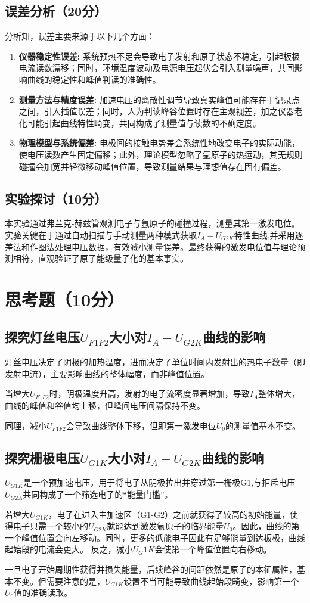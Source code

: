 \documentclass[]{../../templates/Report}%
\begin{document}
\begin{fullreportonly}
\subsection{误差分析（20分）}
分析知，误差主要来源于以下几个方面：
\begin{enumerate}
\item \textbf{仪器稳定性误差:} 系统预热不足会导致电子发射和原子状态不稳定，引起板极电流读数漂移；同时，环境温度波动及电源电压起伏会引入测量噪声，共同影响曲线的稳定性和峰值判读的准确性。
\item \textbf{测量方法与精度误差:} 加速电压的离散性调节导致真实峰值可能存在于记录点之间，引入插值误差；同时，人为判读峰谷位置时存在主观视差，加之仪器老化可能引起曲线特性畸变，共同构成了测量值与读数的不确定度。
\item \textbf{物理模型与系统偏差:} 电极间的接触电势差会系统性地改变电子的实际动能，使电压读数产生固定偏移；此外，理论模型忽略了氩原子的热运动，其无规则碰撞会加宽并轻微移动峰值位置，导致测量结果与理想值存在固有偏差。
\end{enumerate}
\subsection{实验探讨（10分）}
本实验通过弗兰克-赫兹管观测电子与氩原子的碰撞过程，测量其第一激发电位。实验关键在于通过自动扫描与手动测量两种模式获取$I_A-U_{G2K}$特性曲线,并采用逐差法和作图法处理电压数据，有效减小测量误差。最终获得的激发电位值与理论预测相符，直观验证了原子能级量子化的基本事实。
\section{思考题（10分）}
\subsection{探究灯丝电压$U_{F1F2}$大小对$I_A-U_{G2K}$曲线的影响}
灯丝电压决定了阴极的加热温度，进而决定了单位时间内发射出的热电子数量（即发射电流），主要影响曲线的整体幅度，而非峰值位置。
\par
当增大$U_{F1F2}$时，阴极温度升高，发射的电子流密度显著增加，导致$I_A$整体增大，曲线的峰值和谷值均上移，但峰间电压间隔保持不变。
\par
同理，减小$U_{F1F2}$会导致曲线整体下移，但即第一激发电位$U_0$的测量值基本不变。

\subsection{探究栅极电压$U_{G1K}$大小对$I_A-U_{G2K}$曲线的影响}
$U_{G1K}$是一个预加速电压，用于将电子从阴极拉出并穿过第一栅极G1,与拒斥电压$U_{G2A}$共同构成了一个筛选电子的“能量门槛”。
\par
若增大$U_{G1K}$，电子在进入主加速区（G1-G2）之前就获得了较高的初始能量，使得电子只需一个较小的$U_{G2K}$就能达到激发氩原子的临界能量$U_0$。因此，曲线的第一个峰值位置会向左移动。同时，更多的低能电子因此有足够能量到达板极，曲线起始段的电流会更大。
反之，减小$U_G1K$会使第一个峰值位置向右移动。
\par
一旦电子开始周期性获得并损失能量，后续峰谷的间距依然是原子的本征属性，基本不变。但需要注意的是，$U_{G1K}$设置不当可能导致曲线起始段畸变，影响第一个$U_0$值的准确读取。

\end{fullreportonly}
\end{document}
